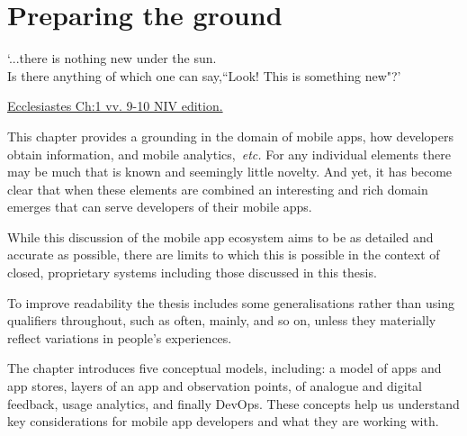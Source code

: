 \setchapterpreamble[u]{\margintoc}
\chapter{Preparing the ground}
\label{chapter-preparing-the-ground}

\epigraph{`...there is nothing new under the sun. \\Is there anything of which one can say,``Look! This is something new"?'}{\href{https://www.biblegateway.com/passage/?search=Ecclesiastes+1\%3A9-10&version=NIV}{Ecclesiastes Ch:1 vv. 9-10 NIV edition.}}

\vspace{10mm}

This chapter provides a grounding in the domain of mobile apps, how developers obtain information, and mobile analytics,~\emph{etc.}  
For any individual elements there may be much that is known and seemingly little novelty. And yet, it has become clear that when these elements are combined an interesting and rich domain emerges that can serve developers of their mobile apps.

While this discussion of the mobile app ecosystem aims to be as detailed and accurate as possible, there are limits to which this is possible in the context of closed, proprietary systems including those discussed in this thesis. 

To improve readability the thesis includes some generalisations rather than using qualifiers throughout, such as often, mainly, and so on, unless they materially reflect variations in people's experiences.

The chapter introduces five 
conceptual models, including: a model of apps and app stores, layers of an app and observation points, of analogue and digital feedback, usage analytics, and finally DevOps. These concepts help us understand key considerations for mobile app developers and what they are working with.


